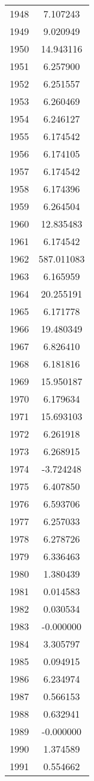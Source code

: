 \documentclass[12pt]{article}
\begin{document}
\begin{longtable}{@{}cc@{}}
1948 & 7.107243 \\
1949 & 9.020949 \\
1950 & 14.943116 \\
1951 & 6.257900 \\
1952 & 6.251557 \\
1953 & 6.260469 \\
1954 & 6.246127 \\
1955 & 6.174542 \\
1956 & 6.174105 \\
1957 & 6.174542 \\
1958 & 6.174396 \\
1959 & 6.264504 \\
1960 & 12.835483 \\
1961 & 6.174542 \\
1962 & 587.011083 \\
1963 & 6.165959 \\
1964 & 20.255191 \\
1965 & 6.171778 \\
1966 & 19.480349 \\
1967 & 6.826410 \\
1968 & 6.181816 \\
1969 & 15.950187 \\
1970 & 6.179634 \\
1971 & 15.693103 \\
1972 & 6.261918 \\
1973 & 6.268915 \\
1974 & -3.724248 \\
1975 & 6.407850 \\
1976 & 6.593706 \\
1977 & 6.257033 \\
1978 & 6.278726 \\
1979 & 6.336463 \\
1980 & 1.380439 \\
1981 & 0.014583 \\
1982 & 0.030534 \\
1983 & -0.000000 \\
1984 & 3.305797 \\
1985 & 0.094915 \\
1986 & 6.234974 \\
1987 & 0.566153 \\
1988 & 0.632941 \\
1989 & -0.000000 \\
1990 & 1.374589 \\
1991 & 0.554662 \\

\end{longtable}
\end{document}
